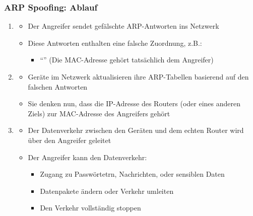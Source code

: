 \subsubsection*{ARP Spoofing: Ablauf}
\begin{infoBox}[title=Wie funktioniert ARP Spoofing?]
    \begin{enumerate}
        \item {}
        \begin{itemize}
            \item Der Angreifer sendet gefälschte ARP-Antworten ins Netzwerk
            \item Diese Antworten enthalten eine falsche Zuordnung, z.B.:
            \begin{itemize}
                \item \enquote{} (Die MAC-Adresse gehört tatsächlich dem Angreifer)
            \end{itemize}
        \end{itemize}
        \item {}
        \begin{itemize}
            \item Geräte im Netzwerk aktualisieren ihre ARP-Tabellen basierend auf den falschen Antworten
            \item Sie denken nun, dass die IP-Adresse des Routers (oder eines anderen Ziels) zur MAC-Adresse des Angreifers gehört
        \end{itemize}
        \item {}
        \begin{itemize}
            \item Der Datenverkehr zwischen den Geräten und dem echten Router wird über den Angreifer geleitet
            \item Der Angreifer kann den Datenverkehr:
            \begin{itemize}
                \item {} Zugang zu Passwörtetrn, Nachrichten, oder sensiblen Daten
                \item {} Datenpakete ändern oder Verkehr umleiten
                \item {} Den Verkehr vollständig stoppen
            \end{itemize}
        \end{itemize}
    \end{enumerate}
\end{infoBox}
